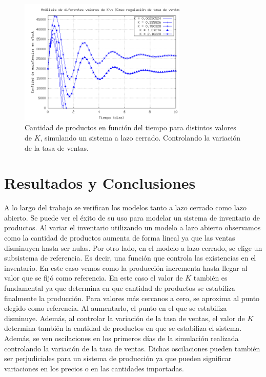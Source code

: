 \documentclass{sig-alternate}
\begin{document}
\begin{figure}[h]
\begin{center}
\includegraphics[width=8cm]{../src/k_plot2.png}
\caption{\label{fig:lazo_cerrado_var_tventas2}Cantidad de productos en función del tiempo para distintos valores de $K$, simulando un sistema
a lazo cerrado. Controlando la variación de la tasa de ventas.}
\end{center}
\end{figure}

\newpage

\section{Resultados y Conclusiones}
\label{results_and_conclusions_section}
A lo largo del trabajo se verifican los modelos tanto a lazo cerrado como lazo abierto. Se puede ver el éxito de su uso para modelar un sistema
de inventario de productos. Al variar el inventario utilizando un modelo a lazo abierto observamos como la cantidad de productos aumenta de
forma lineal ya que las ventas disminuyen hasta ser nulas.  Por otro lado, en el modelo a lazo cerrado, se elige un subsistema de referencia.
Es decir, una función que controla las existencias en el inventario. En este caso vemos como la producción incrementa hasta llegar al valor 
que se fijó como referencia. En este caso el valor de $K$ también es fundamental ya que determina
en que cantidad de productos se estabiliza finalmente la producción. Para valores más cercanos a cero, se aproxima al punto
elegido como referencia. Al aumentarlo, el punto en el que se estabiliza disminuye. Además, al controlar la variación de la tasa de ventas,
el valor de $K$ determina también la cantidad de productos en que se estabiliza el sistema.\\
Además, se ven oscilaciones en los primeros días de la simulación realizada controlando la variación de la tasa de ventas. Dichas oscilaciones
pueden también ser perjudiciales para un sistema de producción ya que pueden significar variaciones en los precios o en las cantidades importadas.


\nocite{*}

\end{document}
